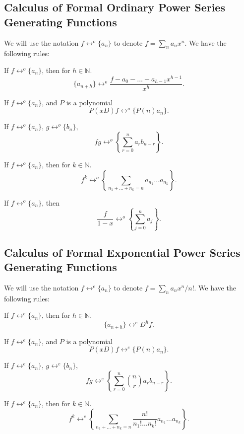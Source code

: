 \documentclass[11pt]{article}
\newcommand{\N}{\mathbb{N}}
\renewcommand{\>}{\rangle}
\newcommand{\<}{\langle}
\begin{document}
 \subsection{Calculus of Formal Ordinary Power Series Generating Functions}
 We will use the notation $f \leftrightarrow^o \{a_n\}$ to denote $f = \sum_n a_n x^n$. 
We have the following rules:
 \begin{fact} If $f \leftrightarrow^o \{a_n\}$, then for $h \in \N$. 
 $$\{a_{n + h}\} \leftrightarrow^o \frac{f - a_0 - \dots - a_{h-1}x^{h-1}}{x^h}.$$
 \end{fact}
  \begin{fact} If $f \leftrightarrow^o \{a_n\}$, and $P$ is a polynomial
 $$P(xD) f \leftrightarrow^o \{P(n) a_n\}.$$
 \end{fact}
 \begin{fact}  If $f \leftrightarrow^o \{a_n\}$, $g \leftrightarrow^o \{b_n\}$, 
 $$fg \leftrightarrow^o \left \{\sum_{r=0}^n a_r b_{n-r}\right \}.$$
 \end{fact}
  \begin{fact} If $f \leftrightarrow^o \{a_n\}$, then for $k \in \N$. 
  $$f^k \leftrightarrow^o \left \{\sum_{n_1 + \dots + n_k = n} a_{n_1} \dots a_{n_k}\right \}.$$
 \end{fact}
   \begin{fact} If $f \leftrightarrow^o \{a_n\}$, then
  $$\frac{f}{1-x}\leftrightarrow^o \left \{\sum_{j=0}^n a_j   \right \}.$$
 \end{fact}
 
  \subsection{Calculus of Formal Exponential Power Series Generating Functions}
 We will use the notation $f \leftrightarrow^e \{a_n\}$ to denote $f = \sum_n a_n x^n/n!$. 
We have the following rules:
 \begin{fact} If $f \leftrightarrow^e \{a_n\}$, then for $h \in \N$. 
 $$\{a_{n + h}\} \leftrightarrow^e D^hf.$$
 \end{fact}
  \begin{fact} If $f \leftrightarrow^e \{a_n\}$, and $P$ is a polynomial
 $$P(xD) f \leftrightarrow^e \{P(n) a_n\}.$$
 \end{fact}
 \begin{fact}  If $f \leftrightarrow^e \{a_n\}$, $g \leftrightarrow^e \{b_n\}$, 
 $$fg \leftrightarrow^e \left \{\sum_{r=0}^n \binom{n}{r}a_r b_{n-r}\right \}.$$
 \end{fact}
  \begin{fact} If $f \leftrightarrow^e \{a_n\}$, then for $k \in \N$. 
  $$f^k \leftrightarrow^e \left \{\sum_{n_1 + \dots + n_k = n}\frac{n!}{n_1! \dots n_k!} a_{n_1} \dots a_{n_k}\right \}.$$
 \end{fact}
 \pagebreak
\end{document}

